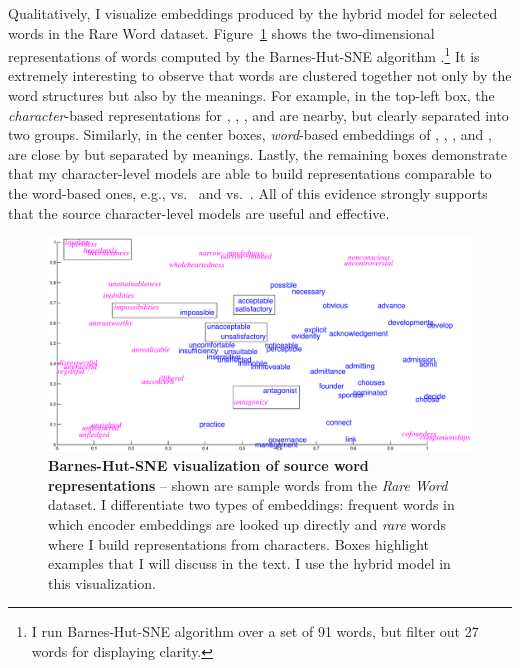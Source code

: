Qualitatively, I visualize embeddings produced by the hybrid model \model{} for
selected words in the Rare Word dataset.
Figure~\ref{f:visual} shows the two-dimensional representations of words
computed by the
Barnes-Hut-SNE algorithm \cite{bhsne}.\footnote{I run Barnes-Hut-SNE algorithm
over a set of 91 words, but filter out 27 words for displaying clarity.} It is extremely interesting to observe that
words are clustered together not only by the word structures but also by
the meanings. For example, in the top-left box,
the {\it character}-based representations for , , , and  are nearby,
but clearly separated into two groups. Similarly, in the center boxes, {\it
word}-based embeddings of
, , , and , are
close by but separated by meanings. Lastly, the remaining boxes demonstrate that my
character-level models are able to build representations comparable to the
word-based ones, e.g.,  vs.\  and 
vs.\ . All of this evidence strongly supports that the source
character-level models are useful and effective.

\begin{figure}
\centering
\includegraphics[width=\textwidth, clip=true, trim= 100 50 0 20]{img/5-emb}
\caption[Barnes-Hut-SNE visualization of source word representations]{{\bf Barnes-Hut-SNE visualization of source word representations} --
shown are sample words from the {\it Rare Word} dataset. I differentiate two types of
embeddings: {\color{blue} frequent} words in which encoder embeddings are looked up directly and {\it {\color{magenta} rare}} words
where I build representations from characters. Boxes highlight examples that
I will discuss in the text. I use the hybrid model \model{} in this visualization.}
\label{f:visual}
\end{figure}


